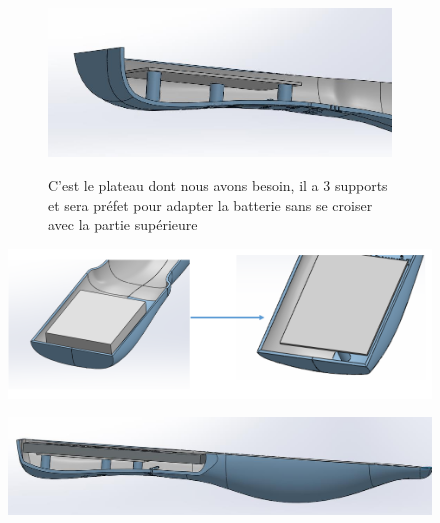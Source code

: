 \FloatBarrier

\begin{figure}[!htbp]
    \centering
    \begin{subfigure}{.6\linewidth}
        \centering
        \includegraphics[width=\linewidth]{assets/conception1/img195.jpg}
    \end{subfigure}
    \hfill
    \begin{subfigure}[m]{.3\linewidth}
       C’est le plateau dont nous avons besoin, il a 3 supports et sera préfet pour adapter la batterie sans se croiser avec la partie supérieure 
    \end{subfigure}
\end{figure}

\FloatBarrier

\begin{figure}[!htbp]
    \centering
    \includegraphics[width=\linewidth]{assets/conception1/11.png}
\end{figure}

\FloatBarrier

\begin{figure}[!htbp]
    \centering
    \includegraphics[width=\linewidth]{assets/conception1/img201.jpg}
\end{figure}

